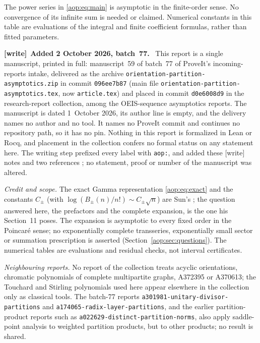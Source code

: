 \documentclass[11pt]{article}
\theoremstyle{remark}\newtheorem{remark}[theorem]{Remark}
\newenvironment{writenote}[1][]{\par\smallskip\begingroup\small
 \noindent\textbf{[write]}\if\relax\detokenize{#1}\relax\else~\textbf{#1.}\fi\ }%
 {\par\endgroup\smallskip}
\begin{document}
The power series in \eqref{aop:eq:main} is asymptotic in the finite-order
sense. No convergence of its infinite sum is needed or claimed. Numerical
constants in this table are evaluations of the integral and finite
coefficient formulas, rather than fitted parameters.

\begin{writenote}[Added 2 October 2026, batch~77]
This report is a single manuscript, printed in full: manuscript~59 of
batch~77 of ProveIt's incoming-reports intake, delivered as the archive
\texttt{orientation-\allowbreak partition-\allowbreak asymptotics.zip} in
commit \texttt{096ee7b87} (main file
\texttt{orientation-\allowbreak partition-\allowbreak asymptotics.tex}, now
\texttt{article.tex}) and placed in commit \texttt{d0e6008d9} in the
research-report collection, among the OEIS-sequence asymptotics reports. The
manuscript is dated 1~October 2026, its author line is empty, and the
delivery names no author and no tool. It names no ProveIt commit and
continues no repository path, so it has no pin. Nothing in this report is
formalized in Lean or Rocq, and placement in the collection confers no
formal status on any statement here. The writing step prefixed every label
with \texttt{aop:}, and added these \textsf{[write]} notes and two references
\cite{aop-tai,aop-cti}; no statement, proof or number of the manuscript was
altered.

\emph{Credit and scope.} The exact Gamma representation \eqref{aop:eq:exact}
and the constants $C_\pm$ (with $\log(B_\pm(n)/n!)\sim C_\pm\sqrt n$) are
Sun's \cite{sun}; the question answered here, the prefactors and the
complete expansion, is the one his Section~11 poses. The expansion is
asymptotic to every fixed order in the Poincar\'e sense; no exponentially
complete transseries, exponentially small sector or summation prescription
is asserted (Section~\ref{aop:sec:questions}). The numerical tables are
evaluations and residual checks, not interval certificates.

\emph{Neighbouring reports.} No report of the collection treats acyclic
orientations, chromatic polynomials of complete multipartite graphs, A372395
or A370613; the Touchard and Stirling polynomials used here appear elsewhere
in the collection only as classical tools. The batch-77 reports
\texttt{a301981-\allowbreak unitary-\allowbreak divisor-\allowbreak partitions}
and \texttt{a174065-\allowbreak radix-\allowbreak layer-\allowbreak partitions},
and the earlier partition-product reports such as
\texttt{a022629-\allowbreak distinct-\allowbreak partition-\allowbreak norms},
also apply saddle-point analysis to weighted partition products, but to
other products; no result is shared.


\end{writenote}
\end{document}
